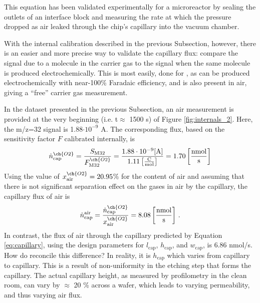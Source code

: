 This equation has been validated experimentally for a microreactor by sealing the outlets of an interface block and measuring the rate at which the pressure dropped as air leaked through the chip's capillary into the vacuum chamber\cite{Henriksen2009}.

With the internal calibration described in the previous Subsection, however, there is an easier and more precise way to validate the capillary flux: compare the signal due to a molecule in the carrier gas to the signal when the same molecule is produced electrochemically. This is most easily, done for , as  can be produced electrochemically with near-100\% Faradaic efficiency, and is also present in air, giving a ``free'' carrier gas measurement.

In the dataset presented in the previous Subsection, an air measurement is provided at the very beginning (i.e. t$\approx$ 1500 s) of Figure \ref{fig:internals_2}. Here, the m/z=32 signal is 1.88$\cdot 10^{-9}$ A. The corresponding  flux, based on the sensitivity factor $F$ calibrated internally, is
\begin{equation}
\dot{n}^{\ch{O2}}_\text{cap} = \frac{S_\text{M32}}{F^{\ch{O2}}_\text{M32}} = \frac{1.88\cdot 10^{-9} \text{[A]}}{1.11 \left[\frac{\text{C}}{\text{mol}}\right]} = 1.70 \left[\frac{\text{nmol}}{\text{s}}\right]
\end{equation}
Using the value of $x^{\ch{O2}}_\text{air}=20.95$\% for the  content of air and assuming that there is not significant separation effect on the gases in air by the capillary, the capillary flux of air is 
\begin{equation}
\dot{n}^{\text{air}}_\text{cap} = \frac{\dot{n}^{\ch{O2}}_\text{cap}}{x^{\ch{O2}}_\text{air}} = 8.08 \left[\frac{\text{nmol}}{\text{s}}\right]\,.
\end{equation}
In contrast, the flux of air through the capillary predicted by Equation \ref{eq:capillary}, using the design parameters for $l_\text{cap}$, $h_\text{cap}$, and $w_\text{cap}$, is 6.86 nmol/s. How do reconcile this difference? In reality, it is $h_\text{cap}$ which varies from capillary to capillary. This is a result of non-uniformity in the etching step that forms the capillary\cite{Trimarco2017_PhD}. The actual capillary height, as measured by profilometry in the clean room, can vary by $\approx$ 20 \% across a wafer, which leads to varying permeability, and thus varying air flux. 

